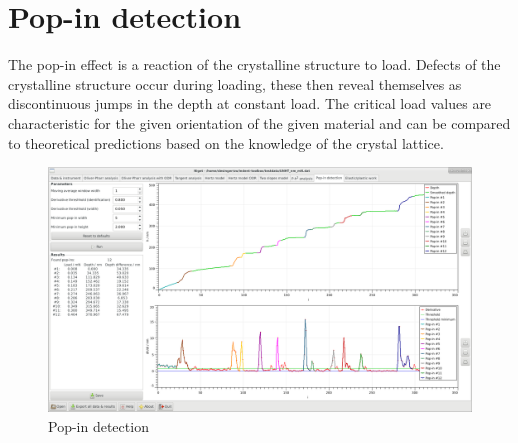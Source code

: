 
\section{Pop-in detection}
The pop-in effect is a reaction of the crystalline structure to load. Defects of the crystalline structure occur during loading, these then reveal themselves as discontinuous jumps in the depth at constant
load. The critical load values are characteristic for the given orientation of the given material and can be compared to theoretical predictions based on the knowledge of the crystal lattice.

\begin{figure}[ht]
  \centering
  \includegraphics[width=\textwidth]{images/screen-popins}
  \caption{Pop-in detection}
\end{figure}

